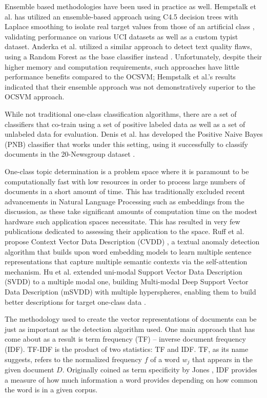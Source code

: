 \documentclass[11pt]{article}
\begin{document}
Ensemble based methodologies have been used in practice as well. Hempstalk et al. has utilized an ensemble-based approach using C4.5 decision trees with Laplace smoothing to isolate real target values from those of an artificial class \cite{hempstalk2008one}, validating performance on various UCI datasets as well as a custom typist dataset. Anderka et al. utilized a similar approach to detect text quality flaws, using a Random Forest as the base classifier instead \cite{anderka2011detection}. Unfortunately, despite their higher memory and computation requirements, such approaches have little performance benefits compared to the OCSVM; Hempstalk et al.'s results indicated that their ensemble approach was not demonstratively superior to the OCSVM approach.

While not traditional one-class classification algorithms, there are a set of classifiers that co-train using a set of positive labeled data as well as a set of unlabeled data for evaluation. Denis et al. has developed the Positive Naive Bayes (PNB) classifier that works under this setting, using it successfully to classify documents in the 20-Newsgroup dataset \cite{denis2003text}.

One-class topic determination is a problem space where it is paramount to be computationally fast with low resources in order to process large numbers of documents in a short amount of time. This has traditionally excluded recent advancements in Natural Language Processing such as embeddings from the discussion, as these take significant amounts of computation time on the modest hardware such application spaces necessitate. This has resulted in very few publications dedicated to assessing their application to the space. Ruff et al. propose Context Vector Data Description (CVDD) \cite{ruff2019self}, a textual anomaly detection algorithm that builds upon word embedding models to learn multiple sentence representations that capture multiple semantic contexts via the self-attention mechanism. Hu et al. extended uni-modal Support Vector Data Description (SVDD) to a multiple modal one, building Multi-modal Deep Support Vector Data Description (mSVDD) with multiple hyperspheres, enabling them to build better descriptions for target one-class data \cite{hu-etal-2021-one}.

The methodology used to create the vector representations of documents can be just as important as the detection algorithm used. One main approach that has come about as a result is term frequency (TF) – inverse document frequency (IDF). TF-IDF is the product of two statistics: TF and IDF. TF, as its name suggests, refers to the normalized frequency $f$ of a word $w_j$ that appears in the given document $D$. Originally coined as term specificity by Jones \cite{jones1972statistical}, IDF provides a measure of how much information a word provides depending on how common the word is in a given corpus.
\end{document}
